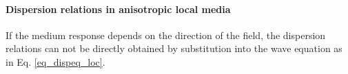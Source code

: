 \paragraph{Dispersion relations in anisotropic local media}  %
If the medium response depends on the direction of the field, the dispersion relations can not be directly obtained by substitution into the wave equation as in Eq. \ref{eq_dispeq_loc}.

